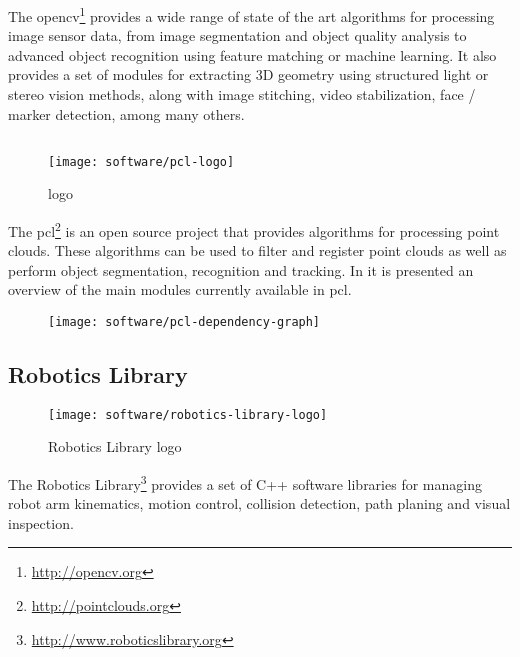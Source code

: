 The \gls{opencv}\footnote{\url{http://opencv.org}} provides a wide range of state of the art algorithms for processing image sensor data, from image segmentation and object quality analysis to advanced object recognition using feature matching or machine learning. It also provides a set of modules for extracting 3D geometry using structured light or stereo vision methods, along with image stitching, video stabilization, face / marker detection, among many others.


\subsection{}

\begin{wrapfigure}{r}{0.23\textwidth}
	\centering
	\vspace*{-2em}
	\texttt{[image: software/pcl-logo]}
	\caption{ logo}
	\label{pcl-logo}
\end{wrapfigure}

The \gls{pcl}\footnote{\url{http://pointclouds.org}} \cite{Rusu2011} is an open source project that provides algorithms for processing point clouds. These algorithms can be used to filter and register point clouds as well as perform object segmentation, recognition and tracking. In  it is presented an overview of the main modules currently available in \gls{pcl}.

\begin{figure}[H]
	\centering
	\texttt{[image: software/pcl-dependency-graph]}
	\caption[]{\protect\footnotemark}
	\label{fig:pcl-dependency-graph}
\end{figure}


\subsection{Robotics Library}

\begin{wrapfigure}{r}{0.23\textwidth}
	\centering
	\vspace*{-2em}
	\texttt{[image: software/robotics-library-logo]}
	\caption{Robotics Library logo}
	\label{fig:robotics-library-logo}
\end{wrapfigure}

The Robotics Library\footnote{\url{http://www.roboticslibrary.org}} provides a set of C++ software libraries for managing robot arm kinematics, motion control, collision detection, path planing and visual inspection.


